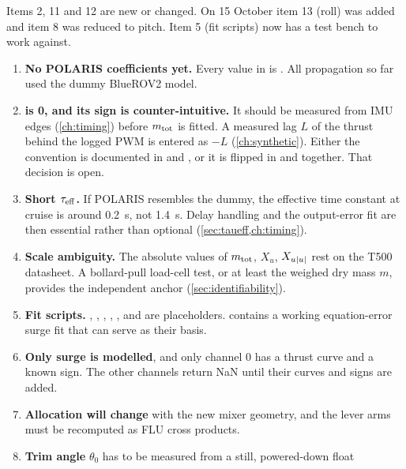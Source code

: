 \begin{revised}[title=Revised 14 October 2026]
Items 2, 11 and 12 are new or changed. On 15 October item 13 (roll) was added and item 8
was reduced to pitch. Item 5 (fit scripts) now has a test bench to work against.
\end{revised}

\begin{enumerate}
  \item \textbf{No POLARIS coefficients yet.} Every value in  is . All
        propagation so far used the dummy BlueROV2 model.
  \item \textbf{ is 0, and its sign is counter-intuitive.} It should be measured
        from IMU edges (\cref{ch:timing}) before $m_\mathrm{tot}$ is fitted. A measured lag $L$ of the
        thrust behind the logged PWM is entered as $-L$ (\cref{ch:synthetic}). Either the
        convention is documented in  and , or it is flipped
        in  and  together. That decision is open.
  \item \textbf{Short $\tau_\mathrm{eff}$.} If POLARIS resembles the dummy, the effective time constant at
        cruise is around \qty{0.2}{\second}, not \qty{1.4}{\second}. Delay handling and the
        output-error fit are then essential rather than optional (\cref{sec:taueff,ch:timing}).
  \item \textbf{Scale ambiguity.} The absolute values of $m_\mathrm{tot}$, $X_u$, $X_{u|u|}$ rest on the T500
        datasheet. A bollard-pull load-cell test, or at least the weighed dry mass $m$, provides
        the independent anchor (\cref{sec:identifiability}).
  \item \textbf{Fit scripts.} , , ,
        , ,  and 
        are placeholders.  contains a working equation-error surge fit
        that can serve as their basis.
  \item \textbf{Only surge is modelled}, and only channel 0 has a thrust curve and a known sign.
        The other channels return NaN until their curves and signs are added.
  \item \textbf{Allocation will change} with the new mixer geometry, and the lever arms must be
        recomputed as FLU cross products.
  \item \textbf{Trim angle} $\theta_0$ has to be measured from a still, powered-down float

\end{enumerate}
